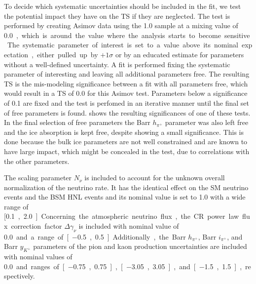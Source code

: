 To decide which systematic uncertainties should be included in the fit, we test the potential impact they have on the TS if they are neglected. The test is performed by creating Asimov data using the \SI{1.0}{\gev} sample at a mixing value of \SI{0.0}, which is around the value where the analysis starts to become sensitive. The systematic parameter of interest is set to a value above its nominal expectation, either pulled up by $+1\sigma$ or by an educated estimate for parameters without a well-defined uncertainty. A fit is performed fixing the systematic parameter of interesting and leaving all additional parameters free. The resulting TS is the mis-modeling significance between a fit with all parameters free, which would result in a TS of 0.0 for this Asimov test. Parameters below a significance of \SI{0.1}{\sigma} are fixed and the test is perfomed in an iterative manner until the final set of free parameters is found.  shows the resulting significances of one of these tests. In the final selection of free parameters the Barr $h_{\pi^+}$ parameter was also left free and the ice absorption is kept free, despite showing a small significance. This is done because the bulk ice parameters are not well constrained and are known to have large impact, which might be concealed in the test, due to correlations with the other parameters.

The scaling parameter $N_{\nu}$ is included to account for the unknown overall normalization of the neutrino rate. It has the identical effect on the SM neutrino events and the BSM HNL events and its nominal value is set to 1.0 with a wide range of [\SI{0.1}, \SI{2.0}].

Concerning the atmospheric neutrino flux, the CR power law flux correction factor $\Delta \gamma_\nu$ is included with nominal value of \SI{0.0} and a range of [\SI{-0.5}, \SI{0.5}]. Additionally, the Barr $h_{\pi^+}$, Barr $i_{\pi^+}$, and Barr $y_{K^+}$ parameters of the pion and kaon production uncertainties are included with nominal values of \SI{0.0} and ranges of [\SI{-0.75}, \SI{0.75}], [\SI{-3.05}, \SI{3.05}], and [\SI{-1.5}, \SI{1.5}], respectively.

